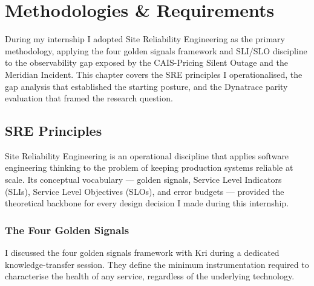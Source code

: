 ﻿%

\chapter{Methodologies \& Requirements}
\label{chap:methodologies}

During my internship I adopted Site Reliability Engineering as the primary
methodology, applying the four golden signals framework and SLI/SLO discipline
to the observability gap exposed by the CAIS-Pricing Silent Outage and the
Meridian Incident. This chapter covers the SRE principles I operationalised,
the gap analysis that established the starting posture, and the Dynatrace
parity evaluation that framed the research question.

\section{SRE Principles}
\label{sec:sre_principles}

Site Reliability Engineering is an operational discipline that applies
software engineering thinking to the problem of keeping production
systems reliable at scale. Its conceptual vocabulary --- golden signals,
Service Level Indicators (SLIs), Service Level Objectives (SLOs), and
error budgets --- provided the theoretical backbone for every design
decision I made during this internship.

\subsection{The Four Golden Signals}

I discussed the four golden signals framework with Kri during a
dedicated knowledge-transfer session. They define the minimum instrumentation required
to characterise the health of any service, regardless of the underlying
technology.

